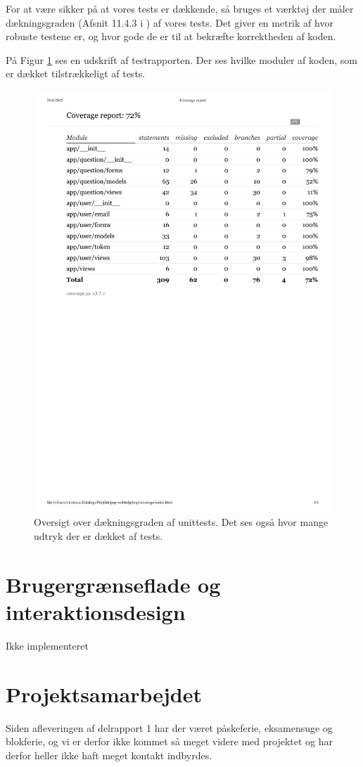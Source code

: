 \documentclass[12pt]{article}
\begin{document}
For at være sikker på at vores tests er dækkende, så bruges et værktøj der måler dækningsgraden (Afsnit 11.4.3 i \cite{OOSE})  af vores tests. Det giver en metrik af hvor robuste testene er, og hvor gode de er til at bekræfte korrektheden af koden.

På Figur \ref{fig:testcoverage} ses en udskrift af testrapporten. Der ses hvilke moduler af koden, som er dækket tilstrækkeligt af tests.

\begin{figure}[htpb]
    \centering
    \includegraphics[width=0.8\linewidth]{figures/testcoverage.pdf}
    \caption{Oversigt over dækningsgraden af unittests. Det ses også hvor mange udtryk der er dækket af tests.}
    \label{fig:testcoverage}
\end{figure}


\section{Brugergrænseflade og interaktionsdesign}
\label{sec:brugergraenseflade}
Ikke implementeret

\section{Projektsamarbejdet}
\label{sec:projektsamarbejdet}
Siden afleveringen af delrapport 1 har der været påskeferie, eksamensuge og blokferie, og vi er derfor ikke kommet så meget videre med projektet og har derfor heller ikke haft meget kontakt indbyrdes.
\end{document}
